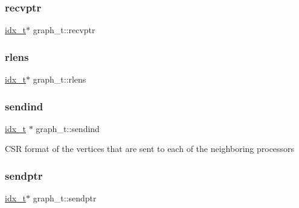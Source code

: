 \subsubsection{\texorpdfstring{recvptr}{recvptr}}
{\footnotesize\ttfamily \hyperlink{3rd_party_2parmetis-4_80_83_2metis_2include_2metis_8h_aaa5262be3e700770163401acb0150f52}{idx\+\_\+t}$\ast$ graph\+\_\+t\+::recvptr}

\mbox{\label{structgraph__t_aeed6b54824c10432c7b64927d03141c2}} 
\subsubsection{\texorpdfstring{rlens}{rlens}}
{\footnotesize\ttfamily \hyperlink{3rd_party_2parmetis-4_80_83_2metis_2include_2metis_8h_aaa5262be3e700770163401acb0150f52}{idx\+\_\+t}$\ast$ graph\+\_\+t\+::rlens}

\mbox{\label{structgraph__t_ac2f30b1e6d043c41e0d57de26557be5b}} 
\subsubsection{\texorpdfstring{sendind}{sendind}}
{\footnotesize\ttfamily \hyperlink{3rd_party_2parmetis-4_80_83_2metis_2include_2metis_8h_aaa5262be3e700770163401acb0150f52}{idx\+\_\+t} $\ast$ graph\+\_\+t\+::sendind}

C\+SR format of the vertices that are sent to each of the neighboring processors \mbox{\label{structgraph__t_a2e9776f42148eabc41c17bbb0c71c19c}} 
\subsubsection{\texorpdfstring{sendptr}{sendptr}}
{\footnotesize\ttfamily \hyperlink{3rd_party_2parmetis-4_80_83_2metis_2include_2metis_8h_aaa5262be3e700770163401acb0150f52}{idx\+\_\+t}$\ast$ graph\+\_\+t\+::sendptr}

\mbox{\label{structgraph__t_ad3013a301ba5be9f81a8b53667d16c3d}} 
